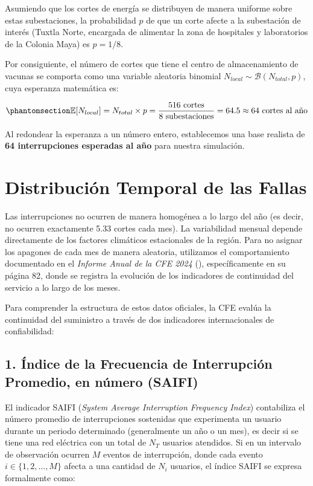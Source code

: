 \documentclass[
  spanish,
  letterpaper,
  DIV=11,
  numbers=noendperiod]{scrreprt}
\theoremstyle{plain}
\theoremstyle{plain}
\theoremstyle{plain}
\theoremstyle{definition}
\theoremstyle{remark}
\begin{document}
Asumiendo que los cortes de energía se distribuyen de manera uniforme
sobre estas subestaciones, la probabilidad \(p\) de que un corte afecte
a la subestación de interés (Tuxtla Norte, encargada de alimentar la
zona de hospitales y laboratorios de la Colonia Maya) es \(p = 1/8\).

Por consiguiente, el número de cortes que tiene el centro de
almacenamiento de vacunas se comporta como una variable aleatoria
binomial \(N_{local} \sim \mathcal{B}(N_{total}, p)\), cuya esperanza
matemática es:

\begin{equation}\phantomsection\label{eq-esperanza-local}{
\mathbb{E}[N_{local}] = N_{total} \times p = \frac{516 \text{ cortes}}{8 \text{ subestaciones}} = 64.5 \approx 64 \text{ cortes al año}
}\end{equation}

Al redondear la esperanza a un número entero, establecemos una base
realista de \textbf{64 interrupciones esperadas al año} para nuestra
simulación.

\section{Distribución Temporal de las
Fallas}\label{sec-distribucion-temporal}

Las interrupciones no ocurren de manera homogénea a lo largo del año (es
decir, no ocurren exactamente 5.33 cortes cada mes). La variabilidad
mensual depende directamente de los factores climáticos estacionales de
la región. Para no asignar los apagones de cada mes de manera aleatoria,
utilizamos el comportamiento documentado en el \emph{Informe Anual de la
CFE 2024} (), específicamente en su página 82, donde se registra
la evolución de los indicadores de continuidad del servicio a lo largo
de los meses.

Para comprender la estructura de estos datos oficiales, la CFE evalúa la
continuidad del suministro a través de dos indicadores internacionales
de confiabilidad:

\subsection{1. Índice de la Frecuencia de Interrupción Promedio, en
número
(SAIFI)}\label{uxedndice-de-la-frecuencia-de-interrupciuxf3n-promedio-en-nuxfamero-saifi}

El indicador SAIFI (\emph{System Average Interruption Frequency Index})
contabiliza el número promedio de interrupciones sostenidas que
experimenta un usuario durante un periodo determinado (generalmente un
año o un mes), es decir si se tiene una red eléctrica con un total de
\(N_T\) usuarios atendidos. Si en un intervalo de observación ocurren
\(M\) eventos de interrupción, donde cada evento
\(i \in \{1, 2, \dots, M\}\) afecta a una cantidad de \(N_i\) usuarios,
el índice SAIFI se expresa formalmente como:
\end{document}
